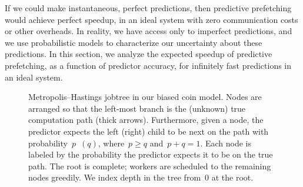 \documentclass[angelino.tex]{subfiles}
\begin{document}
If we could make instantaneous, perfect predictions, then predictive prefetching
would achieve perfect speedup, in an ideal system with zero communication costs
or other overheads.
In reality, we have access only to imperfect predictions, and we use
probabilistic models to characterize our uncertainty about these predictions.
In this section, we analyze the expected speedup of predictive prefetching,
as a function of predictor accuracy, for infinitely fast predictions in
an ideal system.

\begin{figure}[t!]
  \centering%
  \caption{Metropolis--Hastings jobtree in our biased coin model.
  Nodes are arranged so that the left-most branch is the (unknown)
  true computation path (thick arrows). Furthermore, given a node,
  the predictor expects the left (right) child to be next on the path
  with probability~$p$~$(q)$, where~$p \ge q$ and~$p+q = 1$. 
  Each node is labeled by the probability the predictor expects it
  to be on the true path.
  The root is complete; workers are scheduled to the remaining nodes greedily.
  We index depth in the tree from~$0$ at the root.  
}
  \label{fig:biased-coin}
\end{figure}
\end{document}
